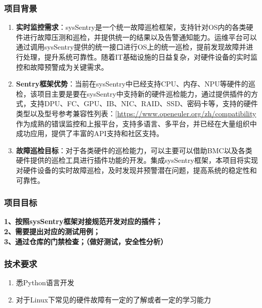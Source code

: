 \documentclass[
]{article}
\begin{document}
\subsubsection{项目背景}\label{ux9879ux76eeux80ccux666f}

\begin{enumerate}
\def\labelenumi{\arabic{enumi}.}
\item
  \textbf{实时监控需求}：sysSentry是一个统一故障巡检框架，支持针对OS内的各类硬件进行故障压测和巡检，并提供统一的结果以及告警通知能力。运维平台可以通过调用sysSentry提供的统一接口进行OS上的统一巡检，提前发现故障并进行处理，提升系统可靠性。随着IT基础设施的日益复杂，对硬件设备的实时监控和故障预警成为关键需求。
\item
  \textbf{Sentry框架优势}：当前在sysSentry中已经支持CPU、内存、NPU等硬件的巡检，该项目主要是要在sysSentry中支持新的硬件巡检能力，通过提供插件的方式，支持DPU、FC、GPU、IB、NIC、RAID、SSD、密码卡等，支持的硬件类型以及型号参考兼容性列表：{[}\url{https://www.openeuler.org/zh/compatibility}
  作为成熟的错误监控和上报平台，支持多语言、多平台，并已经在大量组织中成功应用，提供了丰富的API支持和社区支持。
\item
  \textbf{故障巡检目标}：对于各类硬件的巡检能力，可以主要可以借助BMC以及各类硬件提供的巡检工具进行插件功能的开发。集成sysSentry框架，本项目将实现对硬件设备的实时故障巡检，及时发现并预警潜在问题，提高系统的稳定性和可靠性。
\end{enumerate}

\subsubsection{项目目标}\label{ux9879ux76eeux76eeux6807}

\textbf{1、按照sysSentry框架对接规范开发对应的插件；}\\
\textbf{2、需要提出对应的测试用例；}\\
\textbf{3、通过仓库的门禁检查；（做好测试，安全性分析）}

\subsubsection{技术要求}\label{ux6280ux672fux8981ux6c42}

\begin{enumerate}
\def\labelenumi{\arabic{enumi}.}
\item
  悉Python语言开发
\item
  对于Linux下常见的硬件故障有一定的了解或者一定的学习能力
\end{enumerate}
\end{document}
